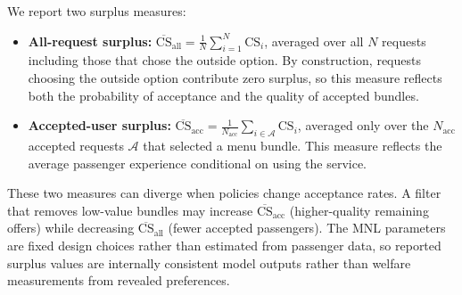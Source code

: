 We report two surplus measures:
\begin{itemize}
\item \textbf{All-request surplus:} $\overline{\text{CS}}_{\text{all}} = \frac{1}{N}\sum_{i=1}^{N} \text{CS}_i$, averaged over all $N$ requests including those that chose the outside option. By construction, requests choosing the outside option contribute zero surplus, so this measure reflects both the probability of acceptance and the quality of accepted bundles.
\item \textbf{Accepted-user surplus:} $\overline{\text{CS}}_{\text{acc}} = \frac{1}{N_{\text{acc}}}\sum_{i \in \mathcal{A}} \text{CS}_i$, averaged only over the $N_{\text{acc}}$ accepted requests $\mathcal{A}$ that selected a menu bundle. This measure reflects the average passenger experience conditional on using the service.
\end{itemize}

These two measures can diverge when policies change acceptance rates. A filter that removes low-value bundles may increase $\overline{\text{CS}}_{\text{acc}}$ (higher-quality remaining offers) while decreasing $\overline{\text{CS}}_{\text{all}}$ (fewer accepted passengers). The MNL parameters are fixed design choices rather than estimated from passenger data, so reported surplus values are internally consistent model outputs rather than welfare measurements from revealed preferences.
